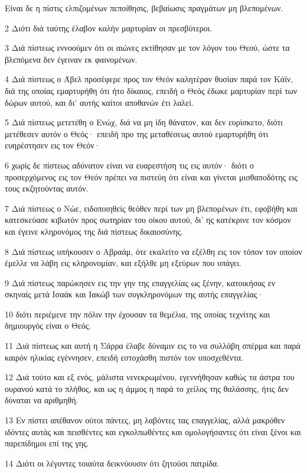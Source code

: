 \par Είναι δε η πίστις ελπιζομένων πεποίθησις, βεβαίωσις πραγμάτων μη βλεπομένων.
\par 2 Διότι διά ταύτης έλαβον καλήν μαρτυρίαν οι πρεσβύτεροι.
\par 3 Διά πίστεως εννοούμεν ότι οι αιώνες εκτίθησαν με τον λόγον του Θεού, ώστε τα βλεπόμενα δεν έγειναν εκ φαινομένων.
\par 4 Διά πίστεως ο Άβελ προσέφερε προς τον Θεόν καλητέραν θυσίαν παρά τον Κάϊν, διά της οποίας εμαρτυρήθη ότι ήτο δίκαιος, επειδή ο Θεός έδωκε μαρτυρίαν περί των δώρων αυτού, και δι' αυτής καίτοι αποθανών έτι λαλεί.
\par 5 Διά πίστεως μετετέθη ο Ενώχ, διά να μη ίδη θάνατον, και δεν ευρίσκετο, διότι μετέθεσεν αυτόν ο Θεός· επειδή προ της μεταθέσεως αυτού εμαρτυρήθη ότι ευηρέστησεν εις τον Θεόν·
\par 6 χωρίς δε πίστεως αδύνατον είναι να ευαρεστήση τις εις αυτόν· διότι ο προσερχόμενος εις τον Θεόν πρέπει να πιστεύη ότι είναι και γίνεται μισθαποδότης εις τους εκζητούντας αυτόν.
\par 7 Διά πίστεως ο Νώε, ειδοποιηθείς θεόθεν περί των μη βλεπομένων έτι, εφοβήθη και κατεσκεύασε κιβωτόν προς σωτηρίαν του οίκου αυτού, δι' ης κατέκρινε τον κόσμον και έγεινε κληρονόμος της διά πίστεως δικαιοσύνης.
\par 8 Διά πίστεως υπήκουσεν ο Αβραάμ, ότε εκαλείτο να εξέλθη εις τον τόπον τον οποίον έμελλε να λάβη εις κληρονομίαν, και εξήλθε μη εξεύρων που υπάγει.
\par 9 Διά πίστεως παρώκησεν εις την γην της επαγγελίας ως ξένην, κατοικήσας εν σκηναίς μετά Ισαάκ και Ιακώβ των συγκληρονόμων της αυτής επαγγελίας·
\par 10 διότι περιέμενε την πόλιν την έχουσαν τα θεμέλια, της οποίας τεχνίτης και δημιουργός είναι ο Θεός.
\par 11 Διά πίστεως και αυτή η Σάρρα έλαβε δύναμιν εις το να συλλάβη σπέρμα και παρά καιρόν ηλικίας εγέννησεν, επειδή εστοχάσθη πιστόν τον υποσχεθέντα.
\par 12 Διά τούτο και εξ ενός, μάλιστα νενεκρωμένου, εγεννήθησαν καθώς τα άστρα του ουρανού κατά το πλήθος, και ως η άμμος η παρά το χείλος της θαλάσσης, ήτις δεν δύναται να αριθμηθή.
\par 13 Εν πίστει απέθανον ούτοι πάντες, μη λαβόντες τας επαγγελίας, αλλά μακρόθεν ιδόντες αυτάς και πεισθέντες και εγκολπωθέντες και ομολογήσαντες ότι είναι ξένοι και παρεπίδημοι επί της γης.
\par 14 Διότι οι λέγοντες τοιαύτα δεικνύουσιν ότι ζητούσι πατρίδα.

